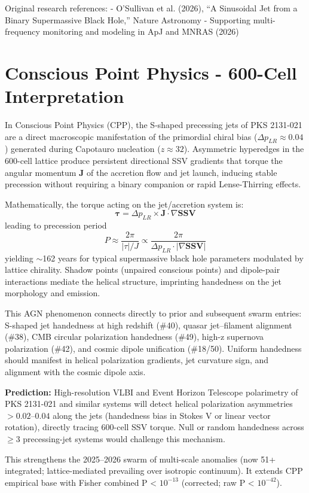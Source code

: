 \documentclass[11pt]{article}
\begin{document}
Original research references:  
- O'Sullivan et al. (2026), ``A Sinusoidal Jet from a Binary Supermassive Black Hole,'' Nature Astronomy  
- Supporting multi-frequency monitoring and modeling in ApJ and MNRAS (2026)

\section{Conscious Point Physics - 600-Cell Interpretation}
In Conscious Point Physics (CPP), the S-shaped precessing jets of PKS 2131-021 are a direct macroscopic manifestation of the primordial chiral bias ($\Delta p_{LR} \approx 0.04$) generated during Capotauro nucleation ($z \approx 32$). Asymmetric hyperedges in the 600-cell lattice produce persistent directional SSV gradients that torque the angular momentum $\mathbf{J}$ of the accretion flow and jet launch, inducing stable precession without requiring a binary companion or rapid Lense-Thirring effects.

Mathematically, the torque acting on the jet/accretion system is:  
\[
\mathbf{\tau} = \Delta p_{LR} \times \mathbf{J} \cdot \nabla \mathbf{SSV}
\]  
leading to precession period  
\[
P \approx \frac{2\pi}{|\tau| / J} \propto \frac{2\pi}{\Delta p_{LR} \cdot |\nabla \mathbf{SSV}|}
\]  
yielding $\sim$162 years for typical supermassive black hole parameters modulated by lattice chirality. Shadow points (unpaired conscious points) and dipole-pair interactions mediate the helical structure, imprinting handedness on the jet morphology and emission.

This AGN phenomenon connects directly to prior and subsequent swarm entries: S-shaped jet handedness at high redshift (\#40), quasar jet–filament alignment (\#38), CMB circular polarization handedness (\#49), high-z supernova polarization (\#42), and cosmic dipole unification (\#18/50). Uniform handedness should manifest in helical polarization gradients, jet curvature sign, and alignment with the cosmic dipole axis.

\textbf{Prediction:} High-resolution VLBI and Event Horizon Telescope polarimetry of PKS 2131-021 and similar systems will detect helical polarization asymmetries $> 0.02$--$0.04$ along the jets (handedness bias in Stokes V or linear vector rotation), directly tracing 600-cell SSV torque. Null or random handedness across $\geq 3$ precessing-jet systems would challenge this mechanism.

This strengthens the 2025--2026 swarm of multi-scale anomalies (now 51+ integrated; lattice-mediated prevailing over isotropic continuum). It extends CPP empirical base with Fisher combined P < $10^{-13}$ (corrected; raw P < $10^{-42}$).
\end{document}
